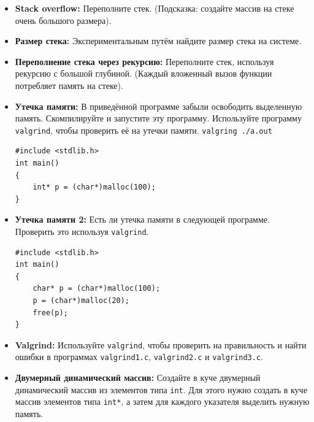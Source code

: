 \documentclass{article}
\begin{document}
\begin{itemize}
\item \textbf{Stack overflow:} Переполните стек. (Подсказка: создайте массив на стеке очень большого размера).
\item \textbf{Размер стека:} Экспериментальным путём найдите размер стека на системе.
\item \textbf{Переполнение стека через рекурсию:} Переполните стек, используя рекурсию с большой глубиной. (Каждый вложенный вызов функции потребляет память на стеке).
\item \textbf{Утечка памяти:}
В приведённой программе забыли освободить выделенную память. Скомпилируйте и запустите эту программу. Используйте программу \texttt{valgrind}, чтобы проверить её на утечки памяти. \texttt{valgring ./a.out}
\begin{lstlisting}
#include <stdlib.h>
int main()
{
	int* p = (char*)malloc(100);
}
\end{lstlisting} 
\item \textbf{Утечка памяти 2:}
Есть ли утечка памяти в следующей программе. Проверить это используя \texttt{valgrind}.
\begin{lstlisting}
#include <stdlib.h>
int main()
{
	char* p = (char*)malloc(100);
	p = (char*)malloc(20);
	free(p);
}
\end{lstlisting} 
\item \textbf{Valgrind:} Используйте \texttt{valgrind}, чтобы проверить на правильность и найти ошибки в программах \texttt{valgrind1.c}, \texttt{valgrind2.c} и \texttt{valgrind3.c}.
\item \textbf{Двумерный динамический массив:} Создайте в куче двумерный динамический массив из элементов типа \texttt{int}. Для этого нужно создать в куче массив элементов типа \texttt{int*}, а затем для каждого указателя выделить нужную память. 
\end{itemize}
\end{document}

